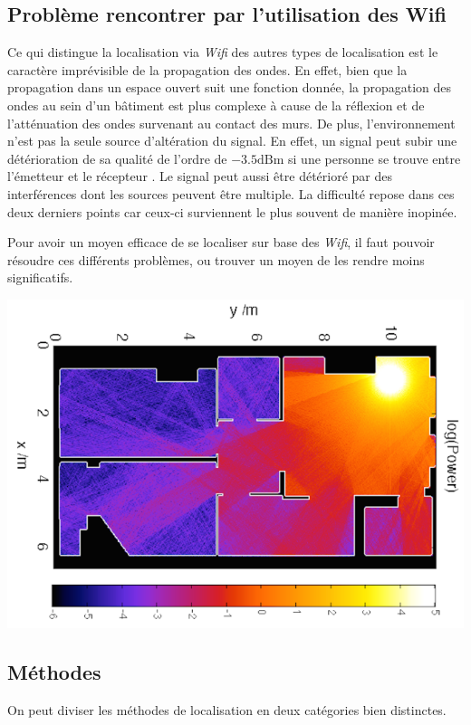 \documentclass[10pt,journal,compsoc]{IEEEtran}
\newcommand{\dBm}{\text{dBm}}
\begin{document}
  \subsection{Problème rencontrer par l'utilisation des Wifi}
    Ce qui distingue la localisation via \textit{Wifi} des autres types de localisation est le caractère imprévisible de la propagation des ondes.
	En effet, bien que la propagation dans un espace ouvert suit une fonction donnée, la propagation des ondes au sein d'un bâtiment est plus complexe
	à cause de la réflexion et de l'atténuation des ondes survenant au contact des murs. De plus, l'environnement n'est pas la seule source d'altération
	du signal. En effet, un signal peut subir une détérioration de sa qualité de l'ordre de $-3.5 \dBm$ si une personne se trouve entre l'émetteur et le
	récepteur \cite{ETH}. Le signal peut aussi être détérioré par des interférences dont les sources peuvent être multiple. La difficulté repose dans
	ces deux derniers points car ceux-ci surviennent le plus souvent de manière inopinée.

    Pour avoir un moyen efficace de se localiser sur base des \textit{Wifi}, il faut pouvoir résoudre ces différents problèmes, ou trouver un moyen de
	les rendre moins significatifs.
    \begin{center}
      \includegraphics[scale=0.3]{images/wifi-propagation.png}
    \end{center}
  \subsection{Méthodes}
    On peut diviser les méthodes de localisation en deux catégories bien distinctes.
\end{document}
